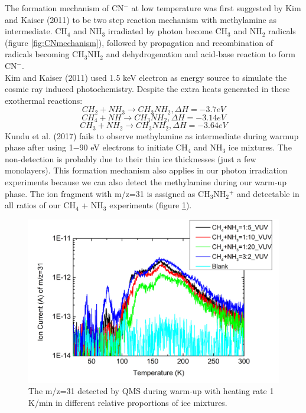The formation mechanism of CN$^-$ at low temperature was first suggested by Kim and Kaiser (2011) \cite{kim} to be two step reaction mechanism with methylamine as intermediate. CH$_4$ and NH$_3$ irradiated by photon become CH$_3$ and NH$_2$ radicals (figure \ref{fig:CNmechanism}), followed by propagation and recombination of radicals becoming CH$_3$NH$_2$ and dehydrogenation and acid-base reaction to form CN$^-$. \\

Kim and Kaiser (2011) \cite{kim} used 1.5 keV electron as energy source to simulate the cosmic ray induced photochemistry.  Despite the extra heats generated in these exothermal reactions:
\begin{equation}
CH_2 + NH_3 \rightarrow CH_3NH_2, \Delta H = -3.7 eV
\label{eq:methylamine_1}
\end{equation}
\begin{equation}
CH_4 + NH \rightarrow CH_3NH_2, \Delta H = -3.14 eV
\label{eq:methylamine_2}
\end{equation}
\begin{equation}
CH_3 + NH_2 \rightarrow CH_3NH_2, \Delta H = -3.64 eV
\label{eq:methylamine_3}
\end{equation}
Kundu et al. (2017) fails to observe methylamine as intermediate during warmup phase after using 1$-$90 eV electrons to initiate CH$_4$ and NH$_3$ ice mixtures\cite{kundu2017electron}. The non-detection is probably due to their thin ice thicknesses (just a few monolayers). This formation mechanism also applies in our photon irradiation experiments because we can also detect the methylamine during our warm-up phase. The ion fragment with m/z=31 is assigned as CH$_3$NH$_2$$^+$ and detectable in all ratios of our CH$_4$ + NH$_3$ experiments (figure \ref{Mass31}).\\

\begin{figure}
\centering
\includegraphics[width=\textwidth]{figures/chapter3/mass31.png}
\caption{The m/z=31 detected by QMS during warm-up with heating rate 1 K/min in different relative proportions of ice mixtures.}
\label{Mass31}
\end{figure}

